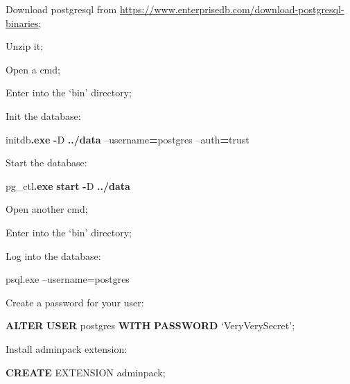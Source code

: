 \documentclass[
]{book}
\newenvironment{Shaded}{\begin{snugshade}}{\end{snugshade}}
\newcommand{\FunctionTok}[1]{\textcolor[rgb]{0.13,0.29,0.53}{\textbf{#1}}}
\newcommand{\KeywordTok}[1]{\textcolor[rgb]{0.13,0.29,0.53}{\textbf{#1}}}
\newcommand{\NormalTok}[1]{#1}
\newcommand{\OperatorTok}[1]{\textcolor[rgb]{0.81,0.36,0.00}{\textbf{#1}}}
\begin{document}
Download postgresql from \url{https://www.enterprisedb.com/download-postgresql-binaries};

Unzip it;

Open a cmd;

Enter into the `bin' directory;

Init the database:

\begin{Shaded}
\begin{Highlighting}[]
\NormalTok{initdb}\OperatorTok{.}\FunctionTok{exe} \OperatorTok{{-}}\NormalTok{D }\OperatorTok{../}\KeywordTok{data}\NormalTok{ –username}\OperatorTok{=}\NormalTok{postgres –auth}\OperatorTok{=}\NormalTok{trust}
\end{Highlighting}
\end{Shaded}

Start the database:

\begin{Shaded}
\begin{Highlighting}[]
\NormalTok{pg\_ctl}\OperatorTok{.}\FunctionTok{exe} \FunctionTok{start} \OperatorTok{{-}}\NormalTok{D }\OperatorTok{../}\KeywordTok{data}
\end{Highlighting}
\end{Shaded}

Open another cmd;

Enter into the `bin' directory;

Log into the database:

\begin{Shaded}
\begin{Highlighting}[]
\NormalTok{psql.exe –username=postgres}
\end{Highlighting}
\end{Shaded}

Create a password for your user:

\begin{Shaded}
\begin{Highlighting}[]
\KeywordTok{ALTER} \FunctionTok{USER}\NormalTok{ postgres }\KeywordTok{WITH} \KeywordTok{PASSWORD}\NormalTok{ ‘VeryVerySecret’;}
\end{Highlighting}
\end{Shaded}

Install adminpack extension:

\begin{Shaded}
\begin{Highlighting}[]
\KeywordTok{CREATE}\NormalTok{ EXTENSION adminpack;}
\end{Highlighting}
\end{Shaded}
\end{document}
